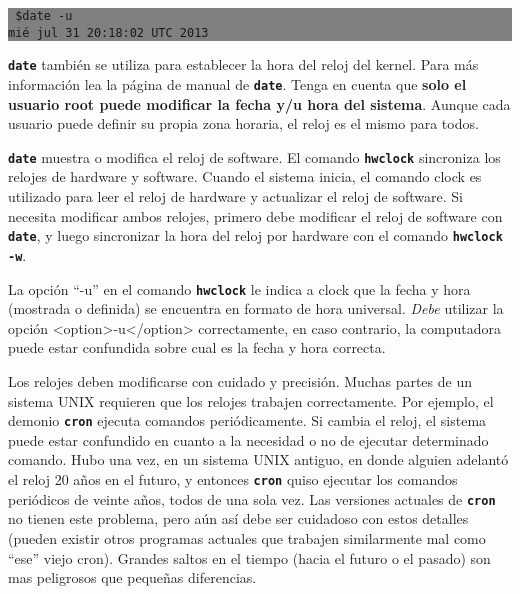 \documentclass[12pt]{article}
\begin{document}
\colorbox{grey}{\parbox[t]{0.95\linewidth}{ \vspace*{0.5cm} {\tt 
\$date -u\\
mié jul 31 20:18:02 UTC 2013
 } \vspace*{0.5cm} } } 


\texttt{\textbf{date}} también se utiliza para establecer la hora del reloj del kernel. Para más información
lea la página de manual de \texttt{\textbf{date}}. Tenga en cuenta que \textbf{solo el usuario root puede 
modificar la fecha y/u hora del sistema}. Aunque cada usuario puede definir su propia zona horaria, el reloj 
es el mismo para todos.



\texttt{\textbf{date}} muestra o modifica el reloj de software. El comando \texttt{\textbf{hwclock}} 
sincroniza los relojes de hardware y software.
Cuando el sistema inicia, el comando clock es utilizado para leer el reloj de hardware y actualizar
el reloj de software. Si necesita modificar ambos relojes, primero debe modificar el reloj de software con \texttt{\textbf{date}},
y luego sincronizar la hora del reloj por hardware con el comando \texttt{\textbf{hwclock -w}}.

La opción ``-u'' en el comando \texttt{\textbf{hwclock}} le indica a clock que la fecha y hora (mostrada o definida)
se encuentra en formato de hora universal. \textit{Debe} utilizar la opción <option>-u</option> correctamente, en
caso contrario, la computadora puede estar confundida sobre cual es la fecha y hora correcta.



Los relojes deben modificarse con cuidado y precisión.
Muchas partes de un sistema UNIX requieren que los relojes trabajen correctamente.
Por ejemplo, el demonio \texttt{\textbf{cron}} ejecuta comandos periódicamente. Si cambia el reloj, el sistema puede
estar confundido en cuanto a la necesidad o no de ejecutar determinado comando.
Hubo una vez, en un sistema UNIX antiguo, en donde alguien adelantó el reloj 20 años en el futuro, y
entonces \texttt{\textbf{cron}} quiso ejecutar
los comandos periódicos de veinte años, todos de una sola vez.
Las versiones actuales de \texttt{\textbf{cron}} no tienen este problema, pero aún así debe ser cuidadoso con estos
detalles (pueden existir otros programas actuales que trabajen similarmente mal como ``ese'' viejo cron).
Grandes saltos en el tiempo (hacia el futuro o el pasado) son mas peligrosos que pequeñas diferencias.
\end{document}
